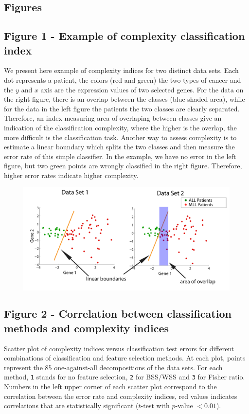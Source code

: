 \documentclass[10pt]{bmc_article}
\newenvironment{bmcformat}{\begin{raggedright}\baselineskip20pt\sloppy\setboolean{publ}{false}}{\end{raggedright}\baselineskip20pt\sloppy}
\begin{document}
\begin{bmcformat}
\section*{Figures}
  \subsection*{Figure 1 - Example of complexity classification index}

We present here example of complexity indices for two distinct data
sets. Each dot represents a patient, the colors (red and green) the
two types of cancer and the $y$ and $x$ axis are the expression values
of two selected genes. For the data on the right figure, there is an
overlap between the classes (blue shaded area), while for the data in
the left figure the patients the two classes are clearly
separated. Therefore, an index measuring area of overlaping between
classes give an indication of the classification complexity, where the
higher is the overlap, the more difficult is the classification
task. Another way to assess complexity is to estimate a linear
boundary which splits the two classes and then measure the error rate
of this simple classifier. In the example, we have no error in the
left figure, but two green points are wrongly classified in the right
figure. Therefore, higher error rates indicate higher complexity.


  \begin{figure}
\centerline{\includegraphics[width=1.0\columnwidth]{figs/complexity}}
\end{figure}

\subsection*{Figure 2 - Correlation between classification methods and complexity indices}

Scatter plot of complexity indices versus classification test errors
for different combinations of classification and feature selection
methods.  At each plot, points represent the 85 one-against-all
decompositions of the data sets. For each method, {\tt 1} stands for
no feature selection, {\tt 2} for BSS/WSS and {\tt 3} for Fisher
ratio. Numbers in the left upper corner of each scatter plot
correspond to the correlation between the error rate and complexity
indices, red values indicates correlations that are statistically
significant ($t$-test with $p$-value $< 0.01$).


\end{bmcformat}
\end{document}
